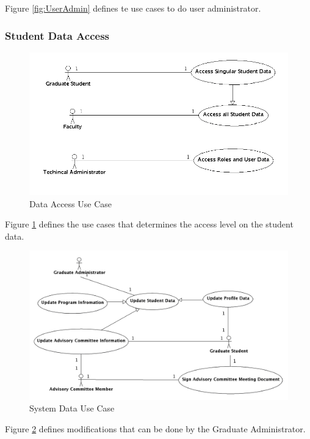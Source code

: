 \documentclass[11pt,a4paper]{report}
\begin{document}
Figure \ref{fig:UserAdmin} defines te use cases to do user administrator. 

\subsubsection{Student Data Access}
\begin{figure}[htp]
\centering
\includegraphics[scale=0.5]{diagrams/use_cases/access_uc.png}
\caption{Data Access Use Case}
\label{fig:UserAccess}
\end{figure}

Figure \ref{fig:UserAccess} defines the use cases that determines the access level on the student data.

\begin{figure}[htp]
\centering
\includegraphics[scale=0.25]{diagrams/use_cases/system_data_uc.png}
\caption{System Data Use Case}
\label{fig:SystemData}
\end{figure}

Figure \ref{fig:SystemData} defines modifications that can be done by the Graduate Administrator. 
\end{document}
